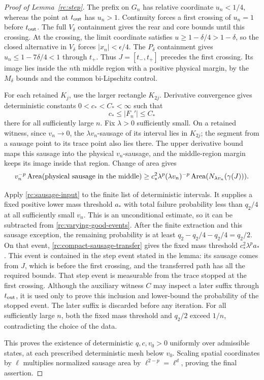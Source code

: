 \documentclass[11pt]{article}
\theoremstyle{definition}
\theoremstyle{remark}
\numberwithin{equation}{section}
\begin{document}
\begin{proof}[Proof of Lemma~\ref{rc:step}]
The prefix on $G_n$ has relative coordinate $u_n<1/4$, whereas the
point at $t_{\rm out}$ has $u_n>1$. Continuity forces a first crossing
of $u_n=1$ before $t_{\rm out}$. The full $V_\delta$ containment gives
the rear and core bounds until this crossing. At the crossing, the
limit coordinate satisfies $u\ge1-\delta/4>1-\delta$, so the closed
alternative in $V_\delta$ forces $|x_n|<\epsilon/4$. The
$P_\delta$ containment gives $u_n\le1-7\delta/4<1$ through $t_+$.
Thus $J=[t_-,t_+]$ precedes the first crossing. Its image lies inside
the $n$th middle region with a positive physical margin, by the
$M_\delta$ bounds and the common bi-Lipschitz control.

For each retained $K_j$, use the larger rectangle $K_{2j}$.
Derivative convergence gives deterministic constants
$0<c_*<C_*<\infty$ such that
\[
 c_*\le |F_n'|\le C_*
\]
there for all sufficiently large $n$. Fix $\lambda>0$ sufficiently
small. On a retained witness, since $v_n\to0$, the
$\lambda v_n$-sausage of its interval lies in $K_{2j}$; the segment
from a sausage point to its trace point also lies there. The upper
derivative bound maps this
sausage into the physical $v_n$-sausage, and the middle-region margin
keeps its image inside that region. Change of area gives
\begin{equation}\label{rc:compact-sausage-transfer}
 v_n^{-p}\operatorname{Area}(\hbox{physical sausage in the middle})
 \ge c_*^2\lambda^p
   (\lambda v_n)^{-p}\operatorname{Area}
      (N_{\lambda v_n}(\gamma(J))).
\end{equation}

Apply \eqref{rc:sausage-input} to the finite list of deterministic
intervals. It supplies a fixed positive lower mass threshold $a_*$ with
total failure probability less than $q_2/4$ at all sufficiently small
$v_n$. This is an unconditional estimate, so it can be subtracted
from \eqref{rc:varying-good-events}. After the finite extraction and
this sausage exception, the remaining probability is at least
$q_2-q_2/4-q_2/4=q_2/2$. On that event,
\eqref{rc:compact-sausage-transfer} gives the fixed mass threshold
$c_*^2\lambda^p a_*$. This event is contained in the step event stated
in the lemma: its sausage comes from $J$, which is before the first
crossing, and the transferred path has all the required bounds.
That step event is measurable from the trace stopped at the first
crossing. Although the auxiliary witness $C$ may inspect a later suffix
through $t_{\rm out}$, it is used only to prove this inclusion and
lower-bound the probability of the stopped event. The later suffix is
discarded before any iteration. For all sufficiently large $n$, both
the fixed mass threshold and $q_2/2$ exceed $1/n$, contradicting the
choice of the data.

This proves the existence of deterministic $q,c,v_0>0$ uniformly over
admissible states, at each prescribed deterministic mesh below $v_0$.
Scaling spatial coordinates by $\ell$ multiplies normalized sausage area by
$\ell^{2-p}=\ell^d$, proving the final assertion.
\end{proof}
\end{document}
